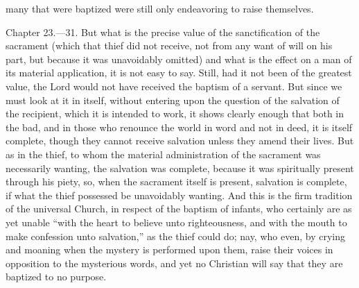 many that were baptized were still only endeavoring to raise themselves.


Chapter 23.—31. But what is the precise value of the sanctification of the sacrament (which that thief did not receive, not from any want of will on his part, but because it was unavoidably omitted) and what is the effect on a man of its material application, it is not easy to say. Still, had it not been of the greatest value, the Lord would not have received the baptism of a servant. But since we must look at it in itself, without entering upon the question of the salvation of the recipient, which it is intended to work, it shows clearly enough that both in the bad, and in those who renounce the world in word and not in deed, it is itself complete, though they cannot receive salvation unless they amend their lives. But as in the thief, to whom the material administration of the sacrament was necessarily wanting, the salvation was complete, because it was spiritually present through his piety, so, when the sacrament itself is present, salvation is complete, if what the thief possessed be unavoidably wanting. And this is the firm tradition of the universal Church, in respect of the baptism of infants, who certainly are as yet unable ``with the heart to believe unto righteousness, and with the mouth to make confession unto salvation,'' as the thief could do; nay, who even, by crying and moaning when the mystery is performed upon them, raise their voices in opposition to the mysterious words, and yet no Christian will say that they are baptized to no purpose.


